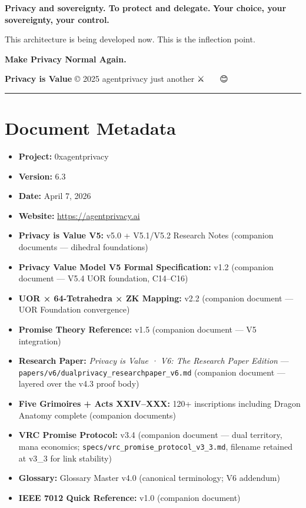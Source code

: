 \documentclass[
  11pt,
]{article}
\begin{document}
\textbf{Privacy and sovereignty. To protect and delegate.} \textbf{Your
choice, your sovereignty, your control.}

This architecture is being developed now. This is the inflection point.

\textbf{Make Privacy Normal Again.}

\textbf{Privacy is Value} © 2025 agentprivacy just another ⚔️ 🧙‍♂️ 🤖 😊

\begin{center}\rule{0.5\linewidth}{0.5pt}\end{center}

\section{Document Metadata}\label{document-metadata}

\begin{itemize}
\item
  \textbf{Project:} 0xagentprivacy
\item
  \textbf{Version:} 6.3
\item
  \textbf{Date:} April 7, 2026
\item
  \textbf{Website:} \url{https://agentprivacy.ai}
\item
  \textbf{Privacy is Value V5:} v5.0 + V5.1/V5.2 Research Notes
  (companion documents --- dihedral foundations)
\item
  \textbf{Privacy Value Model V5 Formal Specification:} v1.2 (companion
  document --- V5.4 UOR foundation, C14--C16)
\item
  \textbf{UOR × 64-Tetrahedra × ZK Mapping:} v2.2 (companion document
  --- UOR Foundation convergence)
\item
  \textbf{Promise Theory Reference:} v1.5 (companion document --- V5
  integration)
\item
  \textbf{Research Paper:} \emph{Privacy is Value · V6: The Research
  Paper Edition} ---
  \texttt{papers/v6/dualprivacy\_researchpaper\_v6.md} (companion
  document --- layered over the v4.3 proof body)
\item
  \textbf{Five Grimoires + Acts XXIV--XXX:} 120+ inscriptions including
  Dragon Anatomy complete (companion documents)
\item
  \textbf{VRC Promise Protocol:} v3.4 (companion document --- dual
  territory, mana economics;
  \texttt{specs/vrc\_promise\_protocol\_v3\_3.md}, filename retained at
  v3\_3 for link stability)
\item
  \textbf{Glossary:} Glossary Master v4.0 (canonical terminology; V6
  addendum)
\item
  \textbf{IEEE 7012 Quick Reference:} v1.0 (companion document)
\end{itemize}
\end{document}
